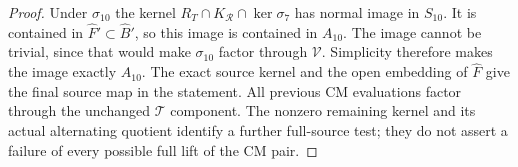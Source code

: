 \begin{proof}
Under $\sigma_{10}$ the kernel
$R_T\cap K_{\mathcal R}\cap\ker\sigma_7$ has
normal image in $S_{10}$. It is contained in
$\widehat F'\subset\widehat B'$, so this
image is contained in $A_{10}$. The image
cannot be trivial, since that would make
$\sigma_{10}$ factor through $\mathcal V$.
Simplicity therefore makes the image exactly
$A_{10}$. The exact source kernel and the
open embedding of $\widehat F$ give the final
source map in the statement. All previous CM
evaluations factor through the unchanged
$\mathcal T$ component. The nonzero remaining
kernel and its actual alternating quotient
identify a further full-source test; they do
not assert a failure of every possible full
lift of the CM pair.
\end{proof}
